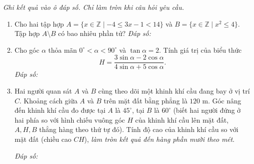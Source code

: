 \documentclass[12pt,a4paper]{article}
\newcommand{\parttitle}[1]{\par\vspace{3pt}{\large\bfseries\color{ink}#1}\par\vspace{2pt}}
\newcommand{\answerbox}{\hfill\textit{Đáp số:}\ \fbox{\rule{0pt}{13pt}\hspace{2.2cm}}}
\begin{document}
\par\vspace{8pt}
\parttitle{PHẦN III. Trả lời ngắn}
\textit{Ghi kết quả vào ô đáp số. Chỉ làm tròn khi câu hỏi yêu cầu.}
\begin{enumerate}
\item Cho hai tập hợp $A = \{x \in \mathbb{Z} \mid -4 \leq 3x - 1 < 14\}$ và $B = \{x \in \mathbb{Z} \mid x^2 \leq 4\}$. Tập hợp $A \setminus B$ có bao nhiêu phần tử?
\answerbox
\item Cho góc $\alpha$ thỏa mãn $0^\circ < \alpha < 90^\circ$ và $\tan\alpha = 2$. Tính giá trị của biểu thức
\[
H = \frac{3\sin\alpha - 2\cos\alpha}{4\sin\alpha + 5\cos\alpha}.
\]
\answerbox
\item \begin{minipage}[t]{0.48\linewidth}
Hai người quan sát $A$ và $B$ cùng theo dõi một khinh khí cầu đang bay ở vị trí $C$. Khoảng cách giữa $A$ và $B$ trên mặt đất bằng phẳng là $120\text{ m}$. Góc nâng đến khinh khí cầu đo được tại $A$ là $45^\circ$, tại $B$ là $60^\circ$ (biết hai người đứng ở hai phía so với hình chiếu vuông góc $H$ của khinh khí cầu lên mặt đất, $A, H, B$ thẳng hàng theo thứ tự đó). Tính độ cao của khinh khí cầu so với mặt đất (chiều cao $CH$), \textit{làm tròn kết quả đến hàng phần mười theo mét}.
\par\vspace{4pt}\answerbox
\end{minipage}\hfill%
\begin{minipage}[t]{0.50\linewidth}
\vspace{-0.4\baselineskip}
\centering
{}
\end{minipage}
\end{enumerate}
\end{document}
